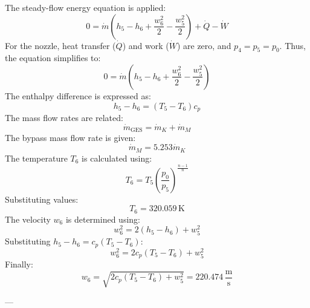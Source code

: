 The steady-flow energy equation is applied:  
\[
0 = \dot{m} (h_5 - h_6 + \frac{w_6^2}{2} - \frac{w_5^2}{2}) + \dot{Q} - \dot{W}
\]  
For the nozzle, heat transfer (\( \dot{Q} \)) and work (\( \dot{W} \)) are zero, and \( p_4 = p_5 = p_0 \). Thus, the equation simplifies to:  
\[
0 = \dot{m} (h_5 - h_6 + \frac{w_6^2}{2} - \frac{w_5^2}{2})
\]  
The enthalpy difference is expressed as:  
\[
h_5 - h_6 = (T_5 - T_6) c_p
\]  
The mass flow rates are related:  
\[
\dot{m}_{\text{GES}} = \dot{m}_K + \dot{m}_M
\]  
The bypass mass flow rate is given:  
\[
\dot{m}_M = 5.253 \dot{m}_K
\]  
The temperature \( T_6 \) is calculated using:  
\[
T_6 = T_5 \left( \frac{p_0}{p_5} \right)^{\frac{n-1}{n}}
\]  
Substituting values:  
\[
T_6 = 320.059 \, \text{K}
\]  
The velocity \( w_6 \) is determined using:  
\[
w_6^2 = 2 (h_5 - h_6) + w_5^2
\]  
Substituting \( h_5 - h_6 = c_p (T_5 - T_6) \):  
\[
w_6^2 = 2 c_p (T_5 - T_6) + w_5^2
\]  
Finally:  
\[
w_6 = \sqrt{2 c_p (T_5 - T_6) + w_5^2} = 220.474 \, \frac{\text{m}}{\text{s}}
\]  

---